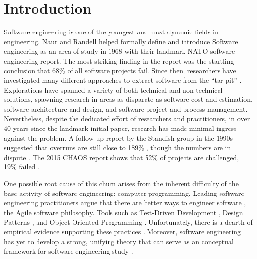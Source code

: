 \chapter{Introduction}

Software engineering is one of the youngest and most dynamic fields in engineering. Naur and Randell helped formally define and introduce Software engineering as an area of study in 1968 with their landmark NATO software engineering report. \cite{Naur1968} The most striking finding in the report was the startling conclusion that 68\% of all software projects fail. Since then, researchers have investigated many different approaches to extract software from the “tar pit” \cite{Moseley2006}. Explorations have spanned a variety of both technical and non-technical solutions, spawning research in areas as disparate as software cost and estimation, software architecture and design, and software project and process management. Nevertheless, despite the dedicated effort of researchers and practitioners, in over 40 years since the landmark initial paper, research has made minimal ingress against the problem. A follow-up report by the Standish group in the 1990s suggested that overruns are still close to 189\% \cite{Hastie2015}, though the numbers are in dispute \cite{Jorgensen2006, Glass2006}. The 2015 CHAOS report shows that 52\% of projects are challenged, 19\% failed \cite{Hastie2015}.

One possible root cause of this churn arises from the inherent difficulty of the base activity of software engineering: computer programming. Leading software engineering practitioners argue that there are better ways to engineer software \cite{Martin2016, Beck2001}, the Agile software philosophy. Tools such as Test-Driven Development \cite{Beck2002, Hendrickson2008}, Design Patterns \cite{Gamma1994,Freeman2004}, and Object-Oriented Programming \cite{Booch2007, Shalloway2004, Beck1989, Wirfs-Brock1990}. Unfortunately, there is a dearth of empirical evidence supporting these practices \cite{Wilson2010} \cite{Briand2012}. Moreover, software engineering has yet to develop a strong, unifying theory that can serve as an conceptual framework for software engineering study \cite{Johnson2012} \cite{Jacobson2009}.

